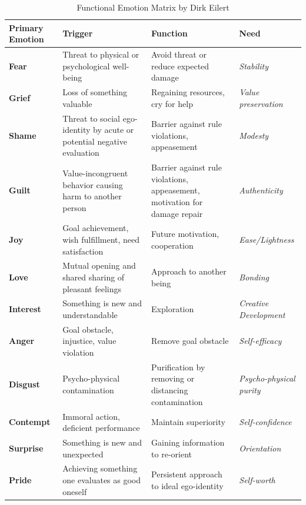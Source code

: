 \begin{table}[H]
    \renewcommand{\arraystretch}{1.5}
    \centering
    \begin{tabular}{L{3cm}|L{4.5cm}|L{4.6cm}|L{3.5cm}}
        \textbf{Primary Emotion} & \textbf{Trigger} & \textbf{Function} & \textbf{Need}\\
        \hline
        \textbf{Fear} & Threat to physical or psychological well-being & Avoid threat or reduce expected damage & \textit{Stability} \\
        \textbf{Grief} & Loss of something valuable & Regaining resources, cry for help & \textit{Value preservation} \\
        \textbf{Shame} & Threat to social ego-identity by acute or potential negative evaluation & Barrier against rule violations, appeasement & \textit{Modesty} \\
        \textbf{Guilt} & Value-incongruent behavior causing harm to another person & Barrier against rule violations, appeasement, motivation for damage repair & \textit{Authenticity} \\
        \textbf{Joy} & Goal achievement, wish fulfillment, need satisfaction & Future motivation, cooperation & \textit{Ease/Lightness} \\
        \textbf{Love} & Mutual opening and shared sharing of pleasant feelings & Approach to another being & \textit{Bonding} \\
        \textbf{Interest} & Something is new and understandable & Exploration & \textit{Creative Development} \\
        \textbf{Anger} & Goal obstacle, injustice, value violation & Remove goal obstacle & \textit{Self-efficacy} \\
        \textbf{Disgust} & Psycho-physical contamination & Purification by removing or distancing contamination & \textit{Psycho-physical purity} \\
        \textbf{Contempt} & Immoral action, deficient performance & Maintain superiority & \textit{Self-confidence} \\
        \textbf{Surprise} & Something is new and unexpected & Gaining information to re-orient & \textit{Orientation} \\
        \textbf{Pride} & Achieving something one evaluates as good oneself & Persistent approach to ideal ego-identity & \textit{Self-worth} \\
    \end{tabular}
    \caption{Functional Emotion Matrix by Dirk Eilert}
    \label{tab:emotionsmatrix}
\end{table}

